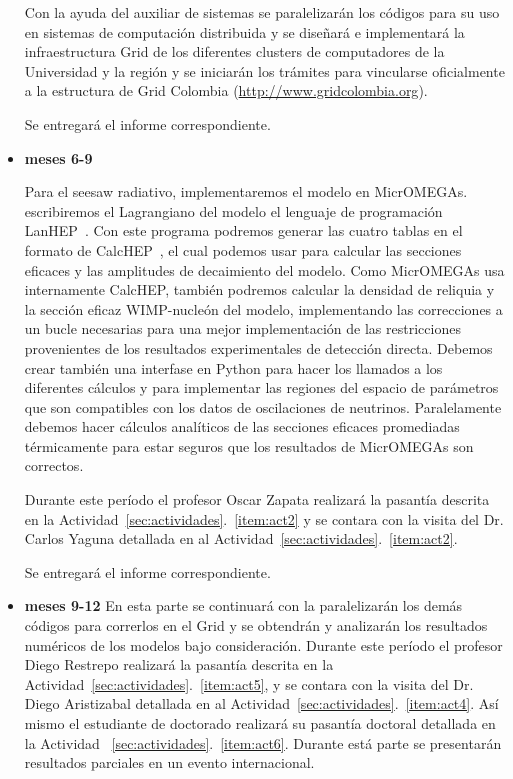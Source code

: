 \begin{itemize}
\begin{gravitinodm}
  Con la ayuda del auxiliar de sistemas se paralelizarán los códigos
  para su uso en sistemas de computación distribuida y se diseñará e
  implementará la infraestructura Grid de los diferentes clusters de
  computadores de la Universidad y la región y se iniciarán los
  trámites para vincularse oficialmente a la estructura de Grid
  Colombia (\url{http://www.gridcolombia.org}).

  Se entregará el informe correspondiente.
\end{gravitinodm}

\item \textbf{meses 6-9}

\begin{darkmatter}
  Para el seesaw radiativo, implementaremos el modelo en MicrOMEGAs.
  escribiremos el Lagrangiano del modelo el lenguaje de programación
  LanHEP~\cite{Semenov:2008jy}. Con este programa podremos generar las
  cuatro tablas en el formato de CalcHEP~\cite{Pukhov:2004ca}, el cual
  podemos usar para calcular las secciones eficaces y las amplitudes
  de decaimiento del modelo.  Como MicrOMEGAs usa internamente
  CalcHEP, también podremos calcular la densidad de reliquia y la
  sección eficaz WIMP-nucleón del modelo, implementando las
  correcciones a un bucle necesarias para una mejor implementación de
  las restricciones provenientes de los resultados experimentales de
  detección directa. Debemos crear también una interfase en Python
  para hacer los llamados a los diferentes cálculos y para implementar
  las regiones del espacio de parámetros que son compatibles con los
  datos de oscilaciones de neutrinos. Paralelamente debemos hacer
  cálculos analíticos de las secciones eficaces promediadas
  térmicamente para estar seguros que los resultados de MicrOMEGAs son
  correctos.

  Durante este período el profesor Oscar Zapata realizará la pasantía
  descrita en la Actividad~\ref{sec:actividades}.~\ref{item:act2} y se
  contara con la visita del Dr. Carlos Yaguna detallada en al
  Actividad~\ref{sec:actividades}.~\ref{item:act2}.
\end{darkmatter}

  Se entregará el informe correspondiente.

\item \textbf{meses 9-12} En esta parte se continuará con la
  paralelizarán los demás códigos para correrlos en el Grid y se
  obtendrán y analizarán los resultados numéricos de los modelos bajo
  consideración.  Durante este período el profesor Diego Restrepo
  realizará la pasantía descrita en la
  Actividad~\ref{sec:actividades}.~\ref{item:act5}, y se
  contara con la visita del Dr. Diego Aristizabal detallada en al
  Actividad~\ref{sec:actividades}.~\ref{item:act4}. Así mismo el
  estudiante de doctorado realizará su pasantía doctoral detallada en
  la Actividad ~\ref{sec:actividades}.~\ref{item:act6}. Durante está
  parte se presentarán resultados parciales en un evento
  internacional.


\end{itemize}
